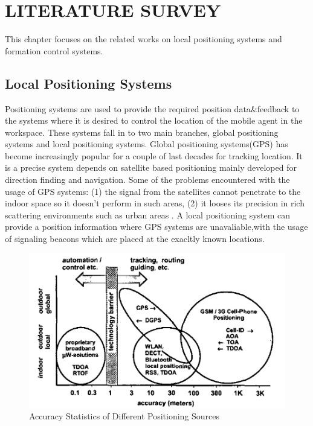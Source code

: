 

\chapter{LITERATURE SURVEY}
\label{chp:Literature Survey}







This chapter focuses on the related works on local positioning systems and formation control systems. 

\section{Local Positioning Systems}

Positioning systems are used to provide the required position data$\&$feedback to the systems where it is desired to control the location of the mobile agent in the workspace.
These systems fall in to two main branches, global positioning systems and local positioning systems. Global positioning systems(GPS) has become increasingly popular for a couple of last decades for tracking location. It is a precise system depends on satellite based positioning mainly developed for direction finding and navigation.  Some of the problems encountered with the usage of GPS systems: (1) the signal from the satellites cannot penetrate to the indoor space so it doesn't perform in such areas, (2) it looses its precision in rich scattering environments such as urban areas \cite{19}.  A local positioning system can provide a position information where GPS systems are unavaliable,with the usage of signaling beacons which are placed at the exacltly known locations.




\begin{figure}[H]
	\caption{Accuracy Statistics of Different Positioning Sources \cite{20}} \label{overview_position}
	\centering
	\includegraphics[scale = 0.4]{gps}
\end{figure} 

